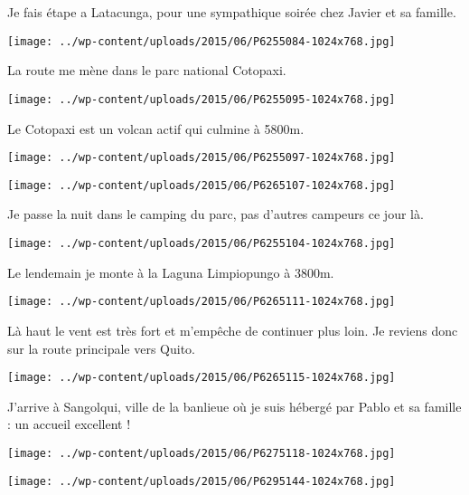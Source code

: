 Je fais étape a Latacunga, pour une sympathique soirée chez Javier et sa famille. 
\begin{center} 
\texttt{[image: ../wp-content/uploads/2015/06/P6255084-1024x768.jpg]} 
\end{center}

La route me mène dans le parc national Cotopaxi. 
\begin{center} 
\texttt{[image: ../wp-content/uploads/2015/06/P6255095-1024x768.jpg]} 
\end{center}
\pagebreak

Le Cotopaxi est un volcan actif qui culmine à 5800m. 
\begin{center} 
\texttt{[image: ../wp-content/uploads/2015/06/P6255097-1024x768.jpg]} 
\end{center}
\begin{center} 
\texttt{[image: ../wp-content/uploads/2015/06/P6265107-1024x768.jpg]} 
\end{center}
\pagebreak

Je passe la nuit dans le camping du parc, pas d'autres campeurs ce jour là. 
\begin{center} 
\texttt{[image: ../wp-content/uploads/2015/06/P6255104-1024x768.jpg]} 
\end{center}

Le lendemain je monte à la Laguna Limpiopungo à 3800m. 
\begin{center} 
\texttt{[image: ../wp-content/uploads/2015/06/P6265111-1024x768.jpg]} 
\end{center}
\pagebreak

Là haut le vent est très fort et m'empêche de continuer plus loin. Je reviens donc sur la route principale vers Quito. 
\begin{center}
\texttt{[image: ../wp-content/uploads/2015/06/P6265115-1024x768.jpg]} 
\end{center}

J'arrive à Sangolqui, ville de la banlieue où je suis hébergé par Pablo et sa famille : un accueil excellent ! 
\begin{center} 
\texttt{[image: ../wp-content/uploads/2015/06/P6275118-1024x768.jpg]} 
\end{center}
\begin{center}
\texttt{[image: ../wp-content/uploads/2015/06/P6295144-1024x768.jpg]} 
\end{center}

